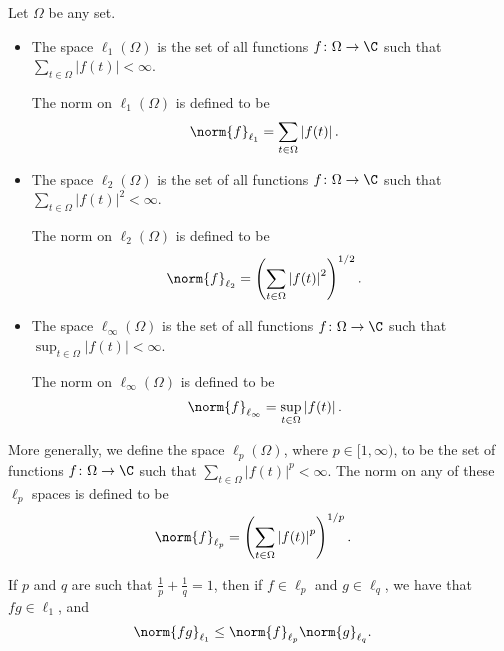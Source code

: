 \begin{definition}\label{def:three_function_spaces}
  Let $\Omega$ be any set.
  \begin{itemize}
    \item The space $\ell_{1}(\Omega)$ is the set of all functions $f\colon \Omega\rightarrow \C$ such that $\displaystyle \sum_{t\in\Omega}\left\vert f(t) \right\vert < \infty$.\newline

      The norm on $\ell_1\left( \Omega \right)$ is defined to be
      \begin{align*}
        \norm{f}_{\ell_1} &= \sum_{t\in\Omega}\left\vert f(t) \right\vert.
      \end{align*}
    \item The space $\ell_{2}(\Omega)$ is the set of all functions $f\colon \Omega\rightarrow \C$ such that $\displaystyle \sum_{t\in\Omega}\left\vert f(t) \right\vert^2 < \infty$.\newline

      The norm on $\ell_2\left( \Omega \right)$ is defined to be
      \begin{align*}
        \norm{f}_{\ell_2} &= \left( \sum_{t\in\Omega}\left\vert f(t) \right\vert^2 \right)^{1/2}.
      \end{align*}
    \item The space $\ell_{\infty}(\Omega)$ is the set of all functions $f\colon \Omega\rightarrow \C$ such that $\sup_{t\in\Omega}\left\vert f(t) \right\vert < \infty$.\newline

      The norm on $\ell_{\infty}(\Omega)$ is defined to be
      \begin{align*}
        \norm{f}_{\ell_{\infty}} &= \sup_{t\in\Omega}\left\vert f(t) \right\vert.
      \end{align*}
  \end{itemize}
  More generally, we define the space $\ell_p\left( \Omega \right)$, where $p\in [1,\infty)$, to be the set of functions $f\colon \Omega\rightarrow \C$ such that $\sum_{t\in\Omega}\left\vert f(t) \right\vert^p < \infty$. The norm on any of these $\ell_p$ spaces is defined to be
  \begin{align*}
    \norm{f}_{\ell_p} &= \left( \sum_{t\in\Omega}\left\vert f(t) \right\vert^{p} \right)^{1/p}.
  \end{align*}
\end{definition}
\begin{theorem}\label{thm:holder_inequality}
  If $p$ and $q$ are such that $\frac{1}{p} + \frac{1}{q} = 1$, then if $f\in \ell_p$ and $g\in \ell_q$, we have that $fg\in \ell_1$, and
  \begin{align*}
    \norm{fg}_{\ell_1} &\leq \norm{f}_{\ell_p}\norm{g}_{\ell_q}.
  \end{align*}
\end{theorem}
